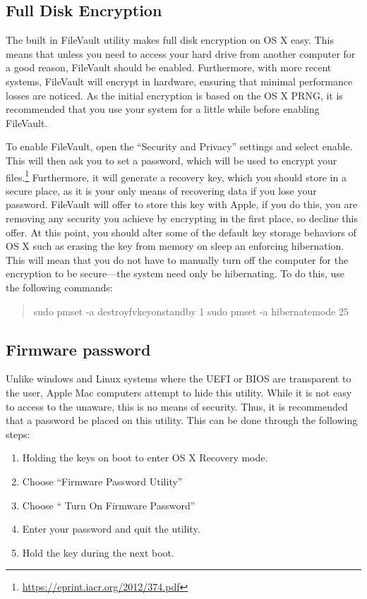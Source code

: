 \documentclass[a4paper,11pt]{report}
\begin{document}
		\subsection{Full Disk Encryption}
			The built in FileVault utility makes full disk encryption on OS X easy. 
			This means that unless you need to access your hard drive from another computer for a good reason, FileVault should be enabled. 
			Furthermore, with more recent systems, FileVault will encrypt in hardware, ensuring that minimal performance losses are noticed. 
			As the initial encryption is based on the OS X PRNG, it is recommended that you use your system for a little while before enabling FileVault. 

			To enable FileVault, open the ``Security and Privacy'' settings and select enable. 
			This will then ask you to set a password, which will be used to encrypt your files.\footnote{\url{https://eprint.iacr.org/2012/374.pdf}} 
			Furthermore, it will generate a recovery key, which you should store in a secure place, as it is your only means of recovering data if you lose your password. 
			FileVault will offer to store this key with Apple, if you do this, you are removing any security you achieve by encrypting in the first place, so decline this offer. 
			At this point, you should alter some of the default key storage behaviors of OS X such as erasing the key from memory on sleep an enforcing hibernation. 
			This will mean that you do not have to manually turn off the computer for the encryption to be secure---the system need only be hibernating. 
			To do this, use the following commands:
			\begin{quote}
				sudo pmset -a destroyfvkeyonstandby 1
				sudo pmset -a hibernatemode 25
			\end{quote}
		\subsection{Firmware password}
			Unlike windows and Linux systems where the UEFI or BIOS are transparent to the user, Apple Mac computers attempt to hide this utility. 
			While it is not easy to access to the unaware, this is no means of security. 
			Thus, it is recommended that a password be placed on this utility. 
			This can be done through the following steps:
			\begin{enumerate}
				\item Holding the keys  on boot to enter OS X Recovery mode.
				\item Choose ``Firmware Password Utility''
				\item Choose `` Turn On Firmware Password''
				\item Enter your password and quit the utility. 
				\item Hold the \Alt{} key during the next boot.
			\end{enumerate}
\end{document}
